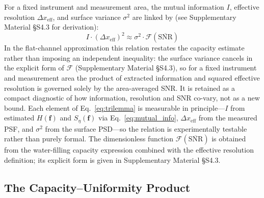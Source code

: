 \documentclass[review,12pt]{elsarticle}
\begin{document}
For a fixed instrument and measurement area, the mutual information $I$, effective resolution $\Delta x_\mathrm{eff}$, and surface variance $\sigma^2$ are linked by (see Supplementary Material \S S4.3 for derivation):
\begin{equation}
    I \cdot (\Delta x_\mathrm{eff})^2 \approx \sigma^2 \cdot \mathcal{F}(\overline{\mathrm{SNR}})
    \label{eq:trilemma}
\end{equation}
In the flat-channel approximation this relation restates the capacity estimate rather than imposing an independent inequality: the surface variance cancels in the explicit form of $\mathcal{F}$ (Supplementary Material \S S4.3), so for a fixed instrument and measurement area the product of extracted information and squared effective resolution is governed solely by the area-averaged SNR. It is retained as a compact diagnostic of how information, resolution and SNR co-vary, not as a new bound. Each element of Eq.~\ref{eq:trilemma} is measurable in principle---$I$ from estimated $H(\mathbf{f})$ and $S_\eta(\mathbf{f})$ via Eq.~\ref{eq:mutual_info}, $\Delta x_\mathrm{eff}$ from the measured PSF, and $\sigma^2$ from the surface PSD---so the relation is experimentally testable rather than purely formal. The dimensionless function $\mathcal{F}(\overline{\mathrm{SNR}})$ is obtained from the water-filling capacity expression combined with the effective resolution definition; its explicit form is given in Supplementary Material \S S4.3.\subsection{The Capacity--Uniformity Product}
\end{document}
